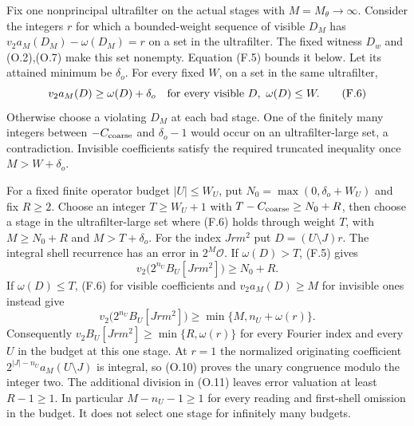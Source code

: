 Fix one nonprincipal ultrafilter on the actual stages with
$M=M_\theta\to\infty$. Consider the integers $r$ for which a
bounded-weight sequence of visible $D_M$ has
$v_2a_M(D_M)-\omega(D_M)=r$ on a set in the ultrafilter.
The fixed witness $D_w$ and (O.2),(O.7) make this set nonempty.
Equation (F.5) bounds it below. Let its attained minimum be
$\delta_o$. For every fixed $W$, on a set in the same ultrafilter,
\[
 v_2a_M(D)\ge\omega(D)+\delta_o
             \quad\hbox{for every visible }D,\ \omega(D)\le W.
 \tag{F.6}
\]
Otherwise choose a violating $D_M$ at each bad stage. One of the
finitely many integers between $-C_{\rm coarse}$ and
$\delta_o-1$ would occur on an ultrafilter-large set, a contradiction.
Invisible coefficients satisfy the required truncated inequality
once $M>W+\delta_o$.

For a fixed finite operator budget $|U|\le W_U$, put
$N_0=\max(0,\delta_o+W_U)$ and fix $R\ge2$.
Choose an integer $T\ge W_U+1$ with
$T-C_{\rm coarse}\ge N_0+R$, then choose a stage in the
ultrafilter-large set where (F.6) holds through weight $T$, with
$M\ge N_0+R$ and $M>T+\delta_o$.
For the index $Jrm^2$ put $D=(U\setminus J)r$.
The integral shell recurrence has an error in $2^M\mathcal O$.
If $\omega(D)>T$, (F.5) gives
\[
 v_2\bigl(2^{n_U}B_U[Jrm^2]\bigr)\ge N_0+R.
\]
If $\omega(D)\le T$, (F.6) for visible coefficients and
$v_2a_M(D)\ge M$ for invisible ones instead give
\[
 v_2\bigl(2^{n_U}B_U[Jrm^2]\bigr)
       \ge\min\{M,n_U+\omega(r)\}.
\]
Consequently $v_2B_U[Jrm^2]\ge\min\{R,\omega(r)\}$ for every
Fourier index and every $U$ in the budget at this one stage.
At $r=1$ the normalized originating coefficient
$2^{|J|-n_U}a_M(U\setminus J)$ is integral, so (O.10) proves
the unary congruence modulo the integer two.
The additional division in (O.11) leaves error valuation at least
$R-1\ge1$.  In particular $M-n_U-1\ge1$ for every reading and
first-shell omission in the budget.
It does not select one stage for infinitely many budgets.

